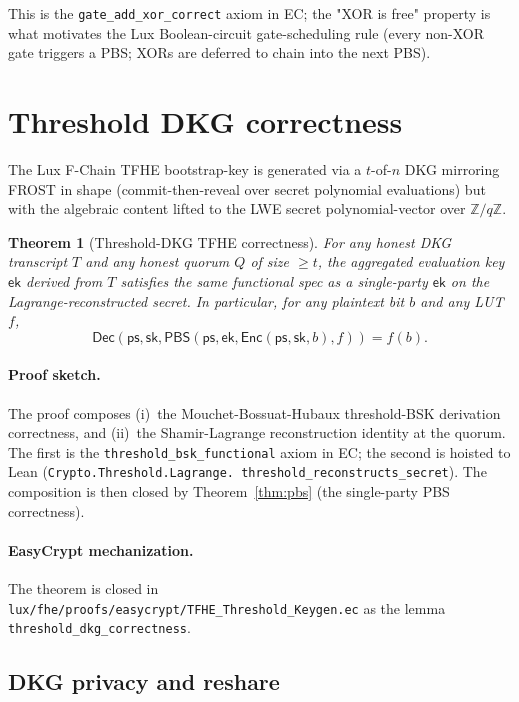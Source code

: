 \documentclass[11pt,a4paper]{article}
\newtheorem{theorem}{Theorem}[section]
\begin{document}
This is the \texttt{gate\_add\_xor\_correct} axiom in EC; the
"XOR is free" property is what motivates the Lux Boolean-circuit
gate-scheduling rule (every non-XOR gate triggers a PBS; XORs are
deferred to chain into the next PBS).

\section{Threshold DKG correctness}\label{sec:threshold}

The Lux F-Chain TFHE bootstrap-key is generated via a $t$-of-$n$
DKG mirroring FROST in shape (commit-then-reveal over secret
polynomial evaluations) but with the algebraic content lifted to
the LWE secret polynomial-vector over $\mathbb{Z}/q\mathbb{Z}$.

\begin{theorem}[Threshold-DKG TFHE correctness]
\label{thm:threshold-dkg}
For any honest DKG transcript $T$ and any honest quorum $Q$ of size
$\geq t$, the aggregated evaluation key $\mathsf{ek}$ derived from
$T$ satisfies the same functional spec as a single-party
$\mathsf{ek}$ on the Lagrange-reconstructed secret. In particular,
for any plaintext bit $b$ and any LUT $f$,
\[
  \mathsf{Dec}(\mathsf{ps}, \mathsf{sk},
    \mathsf{PBS}(\mathsf{ps}, \mathsf{ek},
      \mathsf{Enc}(\mathsf{ps}, \mathsf{sk}, b), f))
  = f(b).
\]
\end{theorem}

\paragraph{Proof sketch.} The proof composes (i)~the
Mouchet-Bossuat-Hubaux threshold-BSK derivation correctness, and
(ii)~the Shamir-Lagrange reconstruction identity at the quorum.
The first is the \texttt{threshold\_bsk\_functional} axiom in EC;
the second is hoisted to Lean (\texttt{Crypto.Threshold.Lagrange.
threshold\_reconstructs\_secret}). The composition is then
closed by Theorem~\ref{thm:pbs} (the single-party PBS correctness).

\paragraph{EasyCrypt mechanization.} The theorem is closed in
\texttt{lux/fhe/proofs/easycrypt/TFHE\_Threshold\_Keygen.ec} as the
lemma \texttt{threshold\_dkg\_correctness}.

\subsection{DKG privacy and reshare}
\end{document}
